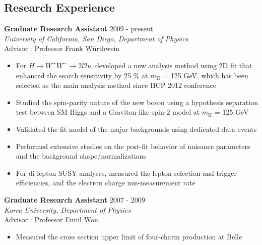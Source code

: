 \documentclass[margin]{res}
\begin{document}
\begin{resume}
\section{Research Experience}
\textbf{Graduate Research Assistant}                             \hfill 2009 - present     \\
\textit{University of California, San Diego, Department of Physics}                        \\
Advisor :  Professor Frank W\"urthwein                                                       
\begin{itemize} \itemsep -2pt  %
 \item For $H\rightarrow W^+W^-\rightarrow2l2\nu$, developed a new analysis method  
       using 2D fit  
       that enhanced the search sensitivity by 25 \% at $m_{\mathrm{H}}$ = 125 GeV, 
       which has been selected as the main analysis method since HCP 2012 conference 
 \item Studied the spin-parity nature of the new boson using a hypothesis separation test 
       between SM Higgs and a Graviton-like spin-2 model at $m_{\mathrm{H}}$ = 125 GeV
 \item Validated the fit model of the major backgrounds using dedicated data events
 \item Performed extensive studies on the post-fit behavior of nuisance parameters 
       and the background shape/normalizations 
 \item For di-lepton SUSY analyses, measured the lepton selection and trigger efficiencies, 
       and the electron charge mis-measurement rate 
\end{itemize}

\textbf{Graduate Research Assistant}           \hfill 2007 - 2009        \\
\textit{Korea University, Department of Physics}       \\
Advisor : Professor Eunil Won                                                                 
 \begin{itemize} \itemsep -2pt  %
 \item Measured the cross section upper limit of four-charm production at Belle   
\\
\end{itemize}



\end{resume}
\end{document}
